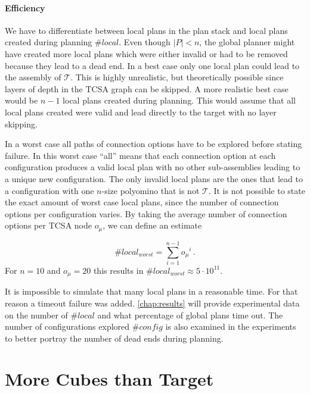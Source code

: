 \paragraph{Efficiency}

We have to differentiate between local plans in the plan stack and local plans created during planning $\#\textit{local}$.
Even though $|P| < n$, the global planner might have created more local plans which were either invalid or had to be removed because they lead to a dead end.
In a best case only one local plan could lead to the assembly of $\mathcal{T}$.
This is highly unrealistic, but theoretically possible since layers of depth in the TCSA graph can be skipped.
A more realistic best case would be $n-1$ local plans created during planning. 
This would assume that all local plans created were valid and lead directly to the target with no layer skipping.

In a worst case all paths of connection options have to be explored before stating failure.
In this worst case ``all'' means that each connection option at each configuration produces a valid local plan with no other sub-assemblies leading to a unique new configuration.
The only invalid local plans are the ones that lead to a configuration with one $n$-size polyomino that is not $\mathcal{T}$.
It is not possible to state the exact amount of worst case local plans, since the number of connection options per configuration varies.
By taking the average number of connection options per TCSA node $o_\mu$, we can define an estimate

\begin{equation}
\#\textit{local}_\textit{worst} = \sum_{i=1}^{n-1} {o_\mu}^i \, .
\end{equation} 
For $n = 10$ and $o_\mu = 20$ this results in $\#\textit{local}_\textit{worst} \approx 5 \cdot 10^{11}$.

It is impossible to simulate that many local plans in a reasonable time.
For that reason a timeout failure was added.
\autoref{chap:results} will provide experimental data on the number of $\#\textit{local}$ and what percentage of global plans time out.
The number of configurations explored $\#\textit{config}$ is also examined in the experiments to better portray the number of dead ends during planning.


\section{More Cubes than Target}
\label{sec:more_cubes}

